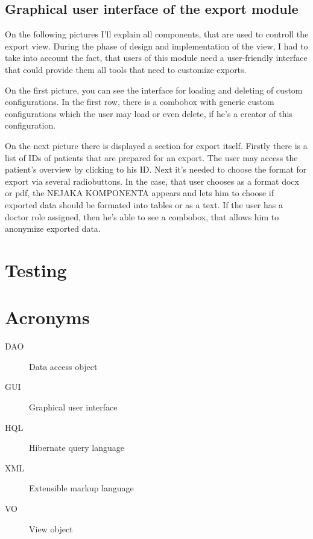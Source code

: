 \documentclass[thesis=B,english]{FITthesis}[2012/10/20]
\begin{document}
\section{Graphical user interface of the export module}
On the following pictures I'll explain all components, that are used to controll the export view. During the phase of design and implementation of the view, I had to take into account the fact, that users of this module need a user-friendly interface that could provide them all tools that need to customize exports.

On the first picture, you can see the interface for loading and deleting of custom configurations. In the first row, there is a combobox with generic custom configurations which the user may load or even delete, if he's a creator of this configuration.

On the next picture there is displayed a section for export itself. Firstly there is a list of IDs of patients that are prepared for an export. The user may access the patient's overview by clicking to his ID. Next it's needed to choose the format for export via several radiobuttons. In the case, that user chooses as a format docx or pdf, the NEJAKA KOMPONENTA appears and lets him to choose if exported data should be formated into tables or as a text. If the user has a doctor role assigned, then he's able to see a combobox, that allows him to anonymize exported data.

\chapter{Testing}
\begin{conclusion}
\end{conclusion}





\appendix

\chapter{Acronyms}
\begin{description}
	\item[DAO] Data access object
	\item[GUI] Graphical user interface
	\item[HQL] Hibernate query language
	\item[XML] Extensible markup language
	\item[VO] View object
\end{description}
\end{document}
